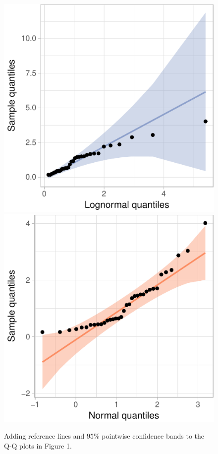 \begin{Schunk}
\begin{figure}

{\centering \includegraphics[width=.4\linewidth]{loy-figures/ex-qq2-1} \includegraphics[width=.4\linewidth]{loy-figures/ex-qq2-2} 

}

\caption[Adding reference lines and $95\%$ pointwise confidence bands to the Q-Q plots in Figure 1]{Adding reference lines and $95\%$ pointwise confidence bands to the Q-Q plots in Figure 1.}\label{fig:ex-qq2}
\end{figure}
\end{Schunk}

